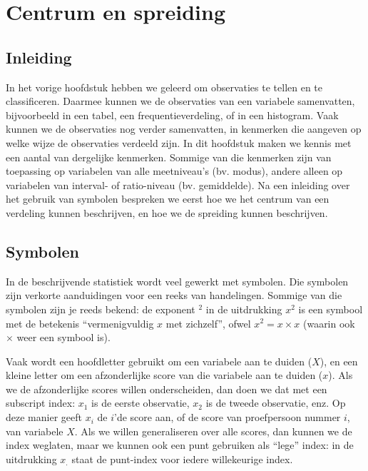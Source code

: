 \documentclass[
]{book}
\begin{document}
\chapter{Centrum en spreiding}\label{ch-centrumenspreiding}

\section{Inleiding}\label{inleiding-4}

In het vorige hoofdstuk hebben we geleerd om observaties te tellen en te
classificeren. Daarmee kunnen we de observaties van een variabele
samenvatten, bijvoorbeeld in een tabel, een frequentieverdeling, of in
een histogram. Vaak kunnen we de observaties nog verder samenvatten, in
kenmerken die aangeven op welke wijze de observaties verdeeld zijn. In
dit hoofdstuk maken we kennis met een aantal van dergelijke kenmerken.
Sommige van die kenmerken zijn van toepassing op variabelen van alle
meetniveau's (bv. modus), andere alleen op variabelen van interval- of
ratio-niveau (bv. gemiddelde). Na een inleiding over het gebruik van
symbolen bespreken we eerst hoe we het centrum van een verdeling kunnen
beschrijven, en hoe we de spreiding kunnen beschrijven.

\section{Symbolen}\label{symbolen}

In de beschrijvende statistiek wordt veel gewerkt met symbolen. Die
symbolen zijn verkorte aanduidingen voor een reeks van handelingen.
Sommige van die symbolen zijn je reeds bekend: de exponent \({}^2\) in de
uitdrukking \(x^2\) is een symbool met de betekenis ``vermenigvuldig \(x\)
met zichzelf'', ofwel \(x^2 = x \times x\) (waarin ook \(\times\) weer een
symbool is).

Vaak wordt een hoofdletter gebruikt om een variabele aan te duiden
(\(X\)), en een kleine letter om een afzonderlijke score van die variabele
aan te duiden (\(x\)). Als we de afzonderlijke scores willen
onderscheiden, dan doen we dat met een subscript index: \(x_1\) is de
eerste observatie, \(x_2\) is de tweede observatie, enz. Op deze manier
geeft \(x_i\) de \(i\)'de score aan, of de score van proefpersoon nummer
\(i\), van variabele \(X\). Als we willen generaliseren over alle scores,
dan kunnen we de index weglaten, maar we kunnen ook een punt gebruiken
als ``lege'' index: in de uitdrukking \(x_.\) staat de punt-index voor
iedere willekeurige index.
\end{document}
